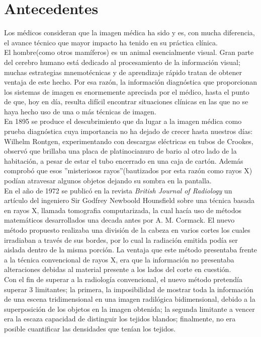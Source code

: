 \documentclass[12pt]{report}
\begin{document}
\section{Antecedentes}
Los médicos consideran que la imagen médica ha sido y es, con mucha diferencia, el avance técnico que mayor impacto ha tenido en su práctica clínica.\\

El hombre(como otros mamíferos) es un animal esencialmente visual. Gran parte del cerebro humano está dedicado al procesamiento de la información visual; muchas estrategias mnemotécnicas y de aprendizaje rápido tratan de obtener ventaja de este hecho. Por esa razón, la información diagnóstica que proporcionan los sistemas de imagen es enormemente apreciada por el médico, hasta el punto de que, hoy en día, resulta difícil encontrar situaciones clínicas en las que no se haya hecho uso de una o más técnicas de imagen.\\ 

En 1895 se produce el descubrimiento que da lugar a la imagen médica como prueba diagnóstica cuya importancia no ha dejado de crecer hasta nuestros días: Wilhelm Rontgen, experimentando con descargas eléctricas en tubos de Crookes, observó que brillaba una placa de platinocianuro de bario al otro lado de la habitación, a pesar de estar el tubo encerrado en una caja de cartón. Además comprobó que esos ''misteriosos rayos''(bautizados por esta razón como rayos X) podían atravesar algunos objetos dejando su sombra en la pantalla.\cite{biom}\\ 

En el año de 1972 se publicó en la revista \textit{British Journal of Radiology} un artículo del ingeniero Sir Godfrey Newboold Hounsfield sobre una
técnica basada en rayos X, llamada tomografia computarizada, la cual hacía uso de métodos matemáticos desarrollados una decada antes por A. M. Cormack.
El nuevo método propuesto realizaba una división de la cabeza en varios cortes los cuales irradiaban a través de sus bordes, por lo cual la radiación emitida podía ser aislada dentro de la misma porción. La ventaja que este método presentaba frente a la técnica convencional de rayos X, era que la información no presentaba alteraciones debidas al material presente a los lados del corte en cuestión.\\ 

Con el fin de superar a la radiología convencional, el nuevo método pretendía superar 3 limitantes; la primera, la imposibilidad de mostrar toda la información de una escena tridimensional en una imagen radilógica bidimensional, debido a la superposición de los objetos en la imagen obtenida; la segunda limitante a vencer era la escaza capacidad de distinguir los tejidos blandos; finalmente, no era posible cuantificar las densidades que tenían los tejidos.\cite{TCFundamentos}  \\ 
\end{document}
